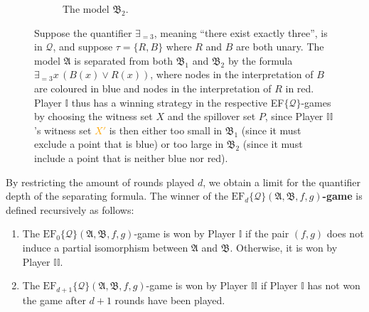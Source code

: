 \documentclass{article}
\theoremstyle{definition}
\begin{document}
\begin{figure}
\begin{subfigure}{0.45\textwidth}
        
        \caption{The model $\mathfrak{B}_2$.}
    \end{subfigure}
    \caption{Suppose the quantifier $\exists_{=3}$, meaning ``there exist exactly three'', is in $\mathcal{Q}$, and suppose $\tau=\{R,B\}$ where $R$ and $B$ are both unary. The model $\mathfrak{A}$ is separated from both $\mathfrak{B}_1$ and $\mathfrak{B}_2$ by the formula $\exists_{=3}x \,(B(x) \lor R(x))$, where nodes in the interpretation of $B$ are coloured in blue and nodes in the interpretation of $R$ in red. Player $\mathbb{I}$ thus has a winning strategy in the respective EF$\{\mathcal{Q}\}$-games by choosing the witness set \textcolor{purple!80!black}{$X$} and the spillover set \textcolor{red!95!black}{$P$}, since Player $\mathbb{II}$'s witness set \textcolor{orange}{$X'$} is then either too small in $\mathfrak{B}_1$ (since it must exclude a point that is blue) or too large in $\mathfrak{B}_2$ (since it must include a point that is neither blue nor red).}
    \label{fig:ef-game}
\end{figure}

By restricting the amount of rounds played $d$, we obtain a limit for the quantifier depth of the separating formula. The winner of the $\mathrm{EF}_d\{\mathcal{Q}\}(\mathfrak{A},\mathfrak{B},f,g)$\textbf{-game} is defined recursively as follows:
\begin{enumerate}
    \item The $\mathrm{EF}_0\{\mathcal{Q}\}(\mathfrak{A},\mathfrak{B},f,g)$-game is won by Player $\mathbb{I}$ if the pair $(f,g)$ does not induce a partial isomorphism between $\mathfrak{A}$ and $\mathfrak{B}$. Otherwise, it is won by Player $\mathbb{II}$.
    \item The $\mathrm{EF}_{d+1}\{\mathcal{Q}\}(\mathfrak{A},\mathfrak{B},f,g)$-game is won by Player $\mathbb{II}$ if Player $\mathbb{I}$ has not won the game after $d+1$ rounds have been played.
\end{enumerate}
\end{document}
